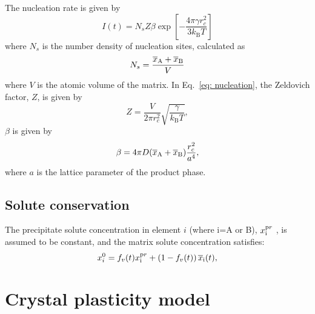 \documentclass[11pt]{scrartcl}
\newcommand{\eref}[1]{Eq.~\eqref{#1}}
\newcommand{\kB}{\ensuremath{k_\text{B}}}
\begin{document}
 The nucleation rate is given by
%
\begin{equation}
\label{eq: nucleation}
I\left(t\right) = N_s Z \beta \exp{\left[-\frac{4\pi\gamma r_c^2}{3\kB T}\right]} 
\end{equation}
%
where $N_s$ is the number density of nucleation sites, calculated as 
\begin{equation}
N_s=\frac{\overline{x}_{ \tiny \textrm{A}}+\overline{x}_{ \tiny \textrm{B}}}{V}
\end{equation}
where \hypertarget{vat}{$V$} is the atomic volume of the matrix.
In \eref{eq: nucleation}, the Zeldovich factor, $Z$, is given by
%
\begin{equation}
\label{eq: soluteconservation}
Z = \frac{V}{2\pi r_c^2} \sqrt{\frac{\gamma}{\kB T}},
\end{equation}
%
$\beta$ is given by
%
\begin{equation}
\label{eq: beta}
\beta = 4\pi D (\overline{x}_{ \tiny \textrm{A}}+\overline{x}_{ \tiny \textrm{B}}) \frac{r_c^2}{a^4},  
\end{equation}
where \hypertarget{latticeparameter}{$a$} is the lattice parameter of the product phase.
 
 
 \subsection{Solute conservation}
The precipitate solute concentration in element $i$ (where i=A or B), $x_{ \tiny \textrm{i}}^{\textrm pr}$ , is assumed to be constant, and the matrix solute concentration satisfies:
%
\begin{equation}
\label{eq: soluteconservation}
{x}_{ \tiny {i}}^{0} = f_v(t) x_{ \tiny \textrm{i}}^{\textrm pr} + \left(1 - f_v(t)\right)\overline{x}_{ \tiny \textrm{i}}(t),
\end{equation}
 

%

%
\section{Crystal plasticity model}
\end{document}
